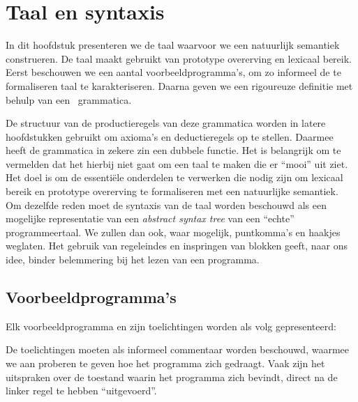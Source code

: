 
\chapter{Taal en syntaxis}

In dit hoofdstuk presenteren we de taal waarvoor we een natuurlijk semantiek construeren. De taal maakt gebruikt van prototype overerving en lexicaal bereik. Eerst beschouwen we een aantal voorbeeldprogramma's, om zo informeel de te formaliseren taal te karakteriseren. Daarna geven we een rigoureuze definitie met behulp van een \BNF\ grammatica.

De structuur van de productieregels van deze grammatica worden in latere hoofdstukken gebruikt om axioma's en deductieregels op te stellen. Daarmee heeft de grammatica in zekere zin een dubbele functie.
Het is belangrijk om te vermelden dat het hierbij niet gaat om een taal te maken die er ``mooi'' uit ziet. Het doel is om de essentiële onderdelen te verwerken die nodig zijn om lexicaal bereik en prototype overerving te formaliseren met een natuurlijke semantiek. Om dezelfde reden moet de syntaxis van de taal worden beschouwd als een mogelijke representatie van een \emph{abstract syntax tree} van een ``echte'' programmeertaal. We zullen dan ook, waar mogelijk, puntkomma's en haakjes weglaten. Het gebruik van regeleindes en inspringen van blokken geeft, naar ons idee, binder belemmering bij het lezen van een programma.%

\section{Voorbeeldprogramma's}
\label{sec:voorbeelden}

Elk voorbeeldprogramma en zijn toelichtingen worden als volg gepresenteerd:

\begin{NoBreak}
\codeFragmentCaption
{}
\end{NoBreak}

De toelichtingen moeten als informeel commentaar worden beschouwd, waarmee we aan proberen te geven hoe het programma zich gedraagt. Vaak zijn het uitspraken over de toestand waarin het programma zich bevindt, direct na de linker regel te hebben ``uitgevoerd''.

